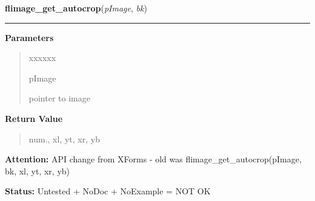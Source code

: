 \hspace{.8\funcindent}\begin{boxedminipage}{\funcwidth}

    \raggedright \textbf{flimage\_get\_autocrop}(\textit{pImage}, \textit{bk})

    \vspace{-1.5ex}

    \rule{\textwidth}{0.5\fboxrule}
\setlength{\parskip}{2ex}
\setlength{\parskip}{1ex}
      \textbf{Parameters}
      \vspace{-1ex}

      \begin{quote}
        \begin{Ventry}{xxxxxx}

          \item[pImage]

          pointer to image

        \end{Ventry}

      \end{quote}

      \textbf{Return Value}
    \vspace{-1ex}

      \begin{quote}
      num., xl, yt, xr, yb

      \end{quote}

\textbf{Attention:} API change from XForms - old was flimage\_get\_autocrop(pImage, bk, xl, yt,
xr, yb)



\textbf{Status:} Untested + NoDoc + NoExample = NOT OK



    \end{boxedminipage}

    \label{xformslib:library:flimage_crop}

    \vspace{0.5ex}

